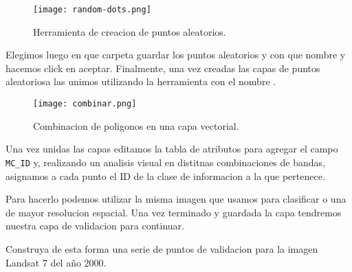 \begin{exa}
  \begin{figure}
    \texttt{[image: random-dots.png]}
    \caption{Herramienta de creacion de puntos aleatorios.}
    \label{fig:dots}
  \end{figure}

  Elegimos luego en que carpeta guardar los puntos aleatorios y con que nombre y hacemos click en aceptar. Finalmente, una vez creadas las capas de puntos aleatoriosa las unimos utilizando la herramienta  con el nombre .

  \begin{figure}
    \texttt{[image: combinar.png]}
    \caption{Combinacion de poligonos en una capa vectorial.}
    \label{}
  \end{figure}

  Una vez unidas las capas editamos la tabla de atributos para agregar el campo
  \verb|MC_ID| y, realizando un analisis visual en distitnas combinaciones de bandas,
  asignamos a cada punto el ID de la clase de informacion a la que pertenece.

  Para hacerlo podemos utilizar la misma imagen que usamos para clasificar o una
  de mayor resolucion espacial. Una vez terminado y guardada la capa tendremos nuestra capa
  de validacion para continuar.

\end{exa}

\begin{act}
  Construya de esta forma una serie de puntos de validacion para la imagen Landsat
  7 del a\~no 2000.
\end{act}

